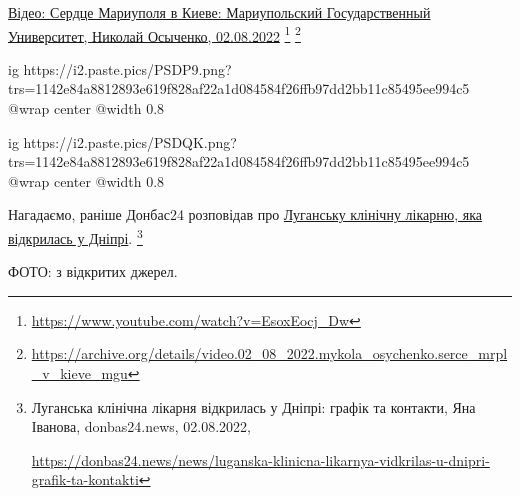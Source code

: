 \href{https://archive.org/details/video.02_08_2022.mykola_osychenko.serce_mrpl_v_kieve_mgu}{%
Відео: Сердце Мариуполя в Киеве: Мариупольский Государственный Университет, Николай Осыченко, 02.08.2022}%
\footnote{\url{https://www.youtube.com/watch?v=EsoxEocj_Dw}} %
\footnote{\url{https://archive.org/details/video.02_08_2022.mykola_osychenko.serce_mrpl_v_kieve_mgu}}

\ifcmt
  ig https://i2.paste.pics/PSDP9.png?trs=1142e84a8812893e619f828af22a1d084584f26ffb97dd2bb11c85495ee994c5
  @wrap center
  @width 0.8
\fi

\ifcmt
  ig https://i2.paste.pics/PSDQK.png?trs=1142e84a8812893e619f828af22a1d084584f26ffb97dd2bb11c85495ee994c5
  @wrap center
  @width 0.8
\fi

Нагадаємо, раніше Донбас24 розповідав про \href{https://donbas24.news/news/luganska-klinicna-likarnya-vidkrilas-u-dnipri-grafik-ta-kontakti}{Луганську клінічну лікарню, яка відкрилась у Дніпрі}.%
\footnote{Луганська клінічна лікарня відкрилась у Дніпрі: графік та контакти, Яна Іванова, donbas24.news, 02.08.2022, \par\url{https://donbas24.news/news/luganska-klinicna-likarnya-vidkrilas-u-dnipri-grafik-ta-kontakti}}

ФОТО: з відкритих джерел.

